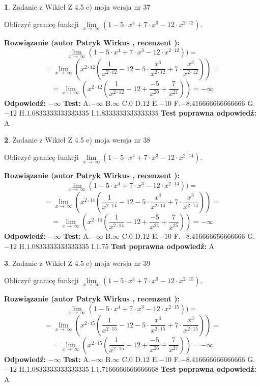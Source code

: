 \documentclass[12pt, a4paper]{article}
\theoremstyle{definition} %
\newtheorem{zad}{}
\newcommand{\zadStart}[1]{\begin{zad}#1\newline}
\newcommand{\zadStop}{\end{zad}}
\newcommand{\rozwStart}[2]{\noindent \textbf{Rozwiązanie (autor #1 , recenzent #2): }\newline}
\newcommand{\rozwStop}{\newline}
\newcommand{\odpStart}{\noindent \textbf{Odpowiedź:}\newline}
\newcommand{\odpStop}{\newline}
\newcommand{\testStart}{\noindent \textbf{Test:}\newline}
\newcommand{\testStop}{\newline}
\newcommand{\kluczStart}{\noindent \textbf{Test poprawna odpowiedź:}\newline}
\newcommand{\kluczStop}{\newline}
\begin{document}
\zadStart{Zadanie z Wikieł Z 4.5 e) moja wersja nr 37}


Obliczyć granicę funkcji  $\lim\limits_{x\to\ \infty}(1 - 5 \cdot x^{4}+7 \cdot x^{3}- 12 \cdot x^{2\cdot12})$.
\zadStop
\rozwStart{Patryk Wirkus}{}
$$\lim\limits_{x\to\ \infty}(1 - 5 \cdot x^{4}+7 \cdot x^{3}- 12 \cdot x^{2\cdot12}))=$$
$$=\lim\limits_{x\to\ \infty}(x^{2\cdot12}(\frac{1}{x^{2\cdot12}}-12 -5 \cdot \frac{x^{4}}{x^{2\cdot12}}+7 \cdot \frac{x^{3}}{x^{2\cdot12}}))=$$
$$=\lim\limits_{x\to\ \infty}(x^{2\cdot12}(\frac{1}{x^{2\cdot12}}-12 + \frac{-5}{x^{20}}+ \frac{7}{x^{21}}))=-\infty$$
\rozwStop
\odpStart
$-\infty$
\odpStop
\testStart
A.$-\infty$ B.$\infty$ C.$0$ D.$12$ E.$-10$
F.$-8.416666666666666$ G.$-12$
H.$1.0833333333333335$
I.$1.8333333333333335$
\testStop
\kluczStart
A
\kluczStop



\zadStart{Zadanie z Wikieł Z 4.5 e) moja wersja nr 38}


Obliczyć granicę funkcji  $\lim\limits_{x\to\ \infty}(1 - 5 \cdot x^{4}+7 \cdot x^{3}- 12 \cdot x^{2\cdot14})$.
\zadStop
\rozwStart{Patryk Wirkus}{}
$$\lim\limits_{x\to\ \infty}(1 - 5 \cdot x^{4}+7 \cdot x^{3}- 12 \cdot x^{2\cdot14}))=$$
$$=\lim\limits_{x\to\ \infty}(x^{2\cdot14}(\frac{1}{x^{2\cdot14}}-12 -5 \cdot \frac{x^{4}}{x^{2\cdot14}}+7 \cdot \frac{x^{3}}{x^{2\cdot14}}))=$$
$$=\lim\limits_{x\to\ \infty}(x^{2\cdot14}(\frac{1}{x^{2\cdot14}}-12 + \frac{-5}{x^{24}}+ \frac{7}{x^{25}}))=-\infty$$
\rozwStop
\odpStart
$-\infty$
\odpStop
\testStart
A.$-\infty$ B.$\infty$ C.$0$ D.$12$ E.$-10$
F.$-8.416666666666666$ G.$-12$
H.$1.0833333333333335$
I.$1.75$
\testStop
\kluczStart
A
\kluczStop



\zadStart{Zadanie z Wikieł Z 4.5 e) moja wersja nr 39}


Obliczyć granicę funkcji  $\lim\limits_{x\to\ \infty}(1 - 5 \cdot x^{4}+7 \cdot x^{3}- 12 \cdot x^{2\cdot15})$.
\zadStop
\rozwStart{Patryk Wirkus}{}
$$\lim\limits_{x\to\ \infty}(1 - 5 \cdot x^{4}+7 \cdot x^{3}- 12 \cdot x^{2\cdot15}))=$$
$$=\lim\limits_{x\to\ \infty}(x^{2\cdot15}(\frac{1}{x^{2\cdot15}}-12 -5 \cdot \frac{x^{4}}{x^{2\cdot15}}+7 \cdot \frac{x^{3}}{x^{2\cdot15}}))=$$
$$=\lim\limits_{x\to\ \infty}(x^{2\cdot15}(\frac{1}{x^{2\cdot15}}-12 + \frac{-5}{x^{26}}+ \frac{7}{x^{27}}))=-\infty$$
\rozwStop
\odpStart
$-\infty$
\odpStop
\testStart
A.$-\infty$ B.$\infty$ C.$0$ D.$12$ E.$-10$
F.$-8.416666666666666$ G.$-12$
H.$1.0833333333333335$
I.$1.7166666666666668$
\testStop
\kluczStart
A
\kluczStop
\end{document}
